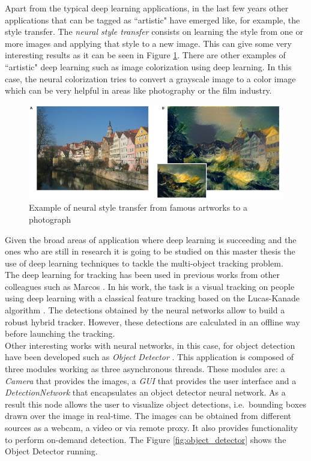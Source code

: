 Apart from the typical deep learning applications, in the last few years other applications that can be tagged as ``artistic" have emerged like, for example, the style transfer. The \textit{neural style transfer} consists on learning the style from one or more images and applying that style to a new image. This can give some very interesting results as it can be seen in Figure \ref{style_transfer}. There are other examples of ``artistic" deep learning such as image colorization using deep learning. In this case, the neural colorization tries to convert a grayscale image to a color image which can be very helpful in areas like photography or the film industry.
\begin{figure}[H]
\begin{center}
\includegraphics[scale=0.4]{figures/style_transfer.png}
\caption{Example of neural style transfer from famous artworks to a photograph \cite{gatys2015neural}}
\label{style_transfer}
\end{center}
\end{figure}
Given the broad areas of application where deep learning is succeeding and the ones who are still in research it is going to be studied on this master thesis the use of deep learning techniques to tackle the multi-object tracking problem.\\
The deep learning for tracking has been used in previous works from other colleagues such as Marcos \cite{tfm-marcos}. In his work, the task is a visual tracking on people using deep learning with a classical feature tracking based on the Lucas-Kanade algorithm \cite{baker2004lucas}. The detections obtained by the neural networks allow to build a robust hybrid tracker. However, these detections are calculated in an offline way before launching the tracking.\\
Other interesting works with neural networks, in this case, for object detection have been developed such as \textit{Object Detector} \cite{condes2018person}.
This application is composed of three modules working as three  asynchronous threads. These modules are: a \textit{Camera} that provides the images, a \textit{GUI} that provides the user interface and a \textit{DetectionNetwork} that encapsulates an object detector neural network. As a result this node allows the user to visualize object detections, i.e.\ bounding boxes drawn over the image in real-time. The images can be obtained from different sources as a webcam, a video or via remote proxy. It also provides functionality to perform on-demand detection. The Figure \ref{fig:object_detector} shows the Object Detector running.
